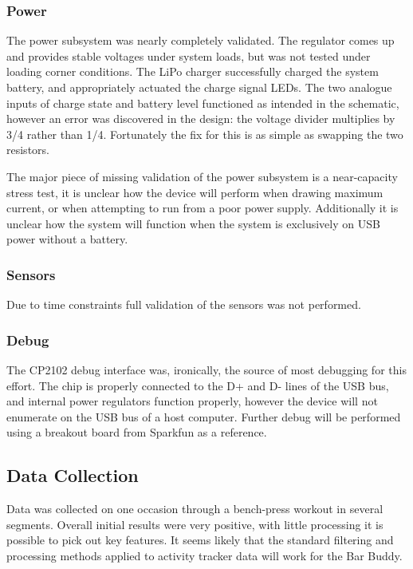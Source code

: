 \documentclass[11pt,oneside]{amsart}
\begin{document}
\subsubsection{Power}
The power subsystem was nearly completely validated. The regulator comes up and provides stable voltages under system loads, but was not tested under loading corner conditions. The LiPo charger successfully charged the system battery, and appropriately actuated the charge signal LEDs. The two analogue inputs of charge state and battery level functioned as intended in the schematic, however an error was discovered in the design: the voltage divider multiplies by 3/4 rather than 1/4. Fortunately the fix for this is as simple as swapping the two resistors.

The major piece of missing validation of the power subsystem is a near-capacity stress test, it is unclear how the device will perform when drawing maximum current, or when attempting to run from a poor power supply. Additionally it is unclear how the system will function when the system is exclusively on USB power without a battery.
\subsubsection{Sensors}
Due to time constraints full validation of the sensors was not performed. 

\subsubsection{Debug}
The CP2102 debug interface was, ironically, the source of most debugging for this effort. The chip is properly connected to the D+ and D- lines of the USB bus, and internal power regulators function properly, however the device will not enumerate on the USB bus of a host computer. Further debug will be performed using a breakout board from Sparkfun as a reference.

\subsection{Data Collection}
Data was collected on one occasion through a bench-press workout in several segments. Overall initial results were very positive, with little processing it is possible to pick out key features. It seems likely that the standard filtering and processing methods applied to activity tracker data will work for the Bar Buddy.
\end{document}
